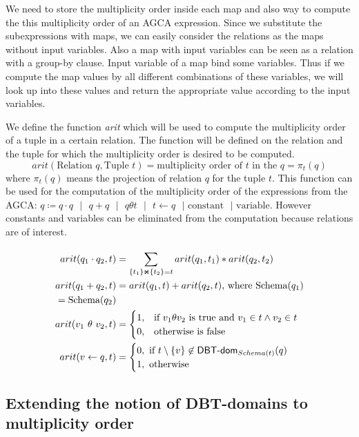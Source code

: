 \documentclass[12pt]{article}
\begin{document}
We need to store the multiplicity order inside each map and also way to compute the this multiplicity order of an AGCA expression. Since we substitute the subexpressions with maps, we can easily consider the relations as the maps without input variables. Also a map with input variables can be seen as a relation with a group-by clause. Input variable of a map bind some variables. Thus if we compute the map values by all different combinations of these variables, we will look up into these values and return the appropriate value according to the input variables.  

We define the function \emph{arit} which will be used to compute the multiplicity order of a tuple in a certain relation. The function will be defined on the relation and the tuple for which the multiplicity order is desired to be computed. $$arit(\text{Relation } q,\text{Tuple } t)=\text{multiplicity order of }t\text{ in the } q =\pi_{t}(q)$$ where $\pi_{t}(q)$ means the projection of relation $q$ for the tuple $t$. This function can be used for the computation of the multiplicity order of the expressions from the AGCA: $q\coloneqq q\cdot q\text{ }|\text{ }q+q\text{ }|\text{ }q \theta t\text{ }|\text{ }t\gets q\text{ }|\text{ constant}\text{ }|\text{ variable}$. However constants and variables can be eliminated from the computation because relations are of interest.

\begin{align}
arit(q_{1}\cdot q_{2},t)&=\sum\limits_{\{t_{1}\}\Join \{t_{2}\}={t}}^{}arit(q_{1},t_{1})*arit(q_{2},t_{2})\\
arit(q_{1} + q_{2},t)&=arit(q_{1},t)+arit(q_{2},t)\text{, where Schema}(q_{1})\\=\text{Schema}(q_{2})\\
arit(v_1\text{ } \theta \text{ } v_2,t)&=\begin{cases}1,& \mbox{if } v_1\theta v_2 \mbox{ is true and }v_{1}\in t \land v_{2}\in t\\
0,& \text{otherwise} \mbox{ is false} 
\end{cases}\\
arit(v\gets q,t)&=\begin{cases}0, \mbox{ if $t\setminus\{v\}\not\in \text{\textsf{DBT-dom}}_{Schema(t)}(q)$}\\ 1, \mbox{ otherwise} \end{cases}
\end{align}

\subsection{Extending the notion of DBT-domains to multiplicity order}\label{DBT-multip}
\end{document}

